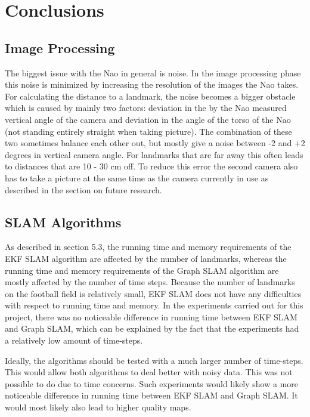 \documentclass{ba-kecs}
\numberwithin{figure}{section}
\numberwithin{equation}{section}
\begin{document}
{\section{Conclusions}
\subsection{Image Processing}
The biggest issue with the Nao in general is noise. In the image processing phase this noise is minimized by increasing the resolution of the images the Nao takes. For calculating the distance to a landmark, the noise becomes a bigger obstacle which is caused by mainly two factors: deviation in the by the Nao measured vertical angle of the camera and deviation in the angle of the torso of the Nao (not standing entirely straight when taking picture).
The combination of these two sometimes balance each other out, but mostly give a noise between -2 and +2 degrees in vertical camera angle. For landmarks that are far away this often leads to distances that are 10 - 30 cm off. To reduce this error the second camera also has to take a picture at the same time as the camera currently in use as described in the section on future research. 

\subsection{SLAM Algorithms}
As described in section 5.3, the running time and memory requirements of the EKF SLAM algorithm are affected by the number of landmarks, whereas the running time and memory requirements of the Graph SLAM algorithm are mostly affected by the number of time steps. Because the number of landmarks on the football field is relatively small, EKF SLAM does not have any difficulties with respect to running time and memory. In the experiments carried out for this project, there was no noticeable difference in running time between EKF SLAM and Graph SLAM, which can be explained by the fact that the experiments had a relatively low amount of time-steps.

Ideally, the algorithms should be tested with a much larger number of time-steps. This would allow both algorithms to deal better with noisy data. This was not possible to do due to time concerns. Such experiments would likely show a more noticeable difference in running time between EKF SLAM and Graph SLAM. It would most likely also lead to higher quality maps.




}
\end{document}
